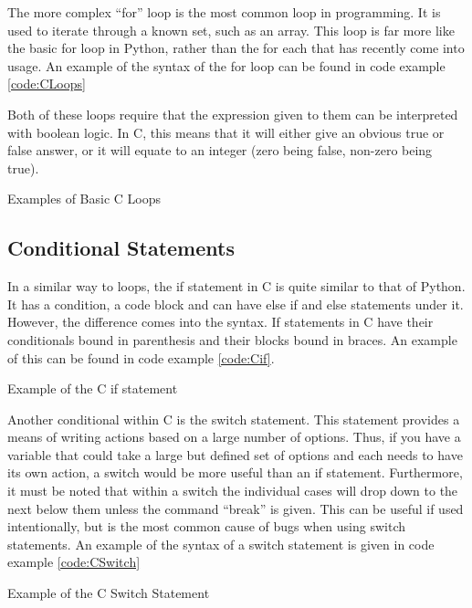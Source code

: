 			The more complex ``for'' loop is the most common loop in programming.
			It is used to iterate through a known set, such as an array.
			This loop is far more like the basic for loop in Python, rather than the for each that has recently come into usage.
			An example of the syntax of the for loop can be found in code example \ref{code:CLoops}

			Both of these loops require that the expression given to them can be interpreted with boolean logic.
			In C, this means that it will either give an obvious true or false answer, or it will equate to an integer (zero being false, non-zero being true).

			\begin{code}
				\caption{Examples of Basic C Loops}
				\label{code:CLoops}
			\end{code}
		\subsection{Conditional Statements}
			In a similar way to loops, the if statement in C is quite similar to that of Python.
			It has a condition, a code block and can have else if and else statements under it.
			However, the difference comes into the syntax.
			\index{C If}
			If statements in C have their conditionals bound in parenthesis and their blocks bound in braces.
			An example of this can be found in code example \ref{code:Cif}.

			\begin{code}
				\ccode{./if.c}
				\caption{Example of the C if statement}
				\label{code:Cif}
			\end{code}

			\index{C Switch}
			Another conditional within C is the switch statement.
			This statement provides a means of writing actions based on a large number of options.
			Thus, if you have a variable that could take a large but defined set of options and each needs to have its own action, a switch would be more useful than an if statement.
			Furthermore, it must be noted that within a switch the individual cases will drop down to the next below them unless the command ``break'' is given.
			This can be useful if used intentionally, but is the most common cause of bugs when using switch statements.
			An example of the syntax of a switch statement is given in code example \ref{code:CSwitch}

			\begin{code}
				\ccode{./CSwitch.c}
				\caption{Example of the C Switch Statement}
				\label{code:CSwitch}
			\end{code}
